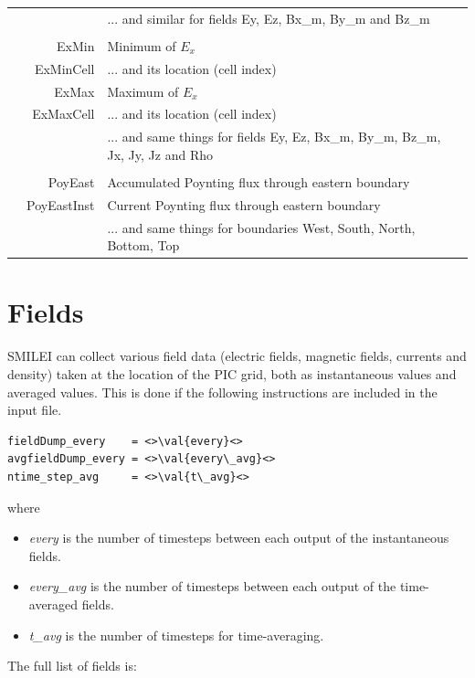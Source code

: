 \documentclass[11pt]{article}
\newcommand{\val}[1]{{\ttfamily \textit{#1}}}
\begin{document}
\begin{tabularx}{\textwidth}{X r | l X}
& & ... and similar for fields Ey, Ez, Bx\_m, By\_m and Bz\_m & \\
& & & \\
& ExMin & Minimum of $E_x$ & \\
& ExMinCell &  ... and its location (cell index) & \\
& ExMax & Maximum of $E_x$ & \\
& ExMaxCell &  ... and its location (cell index) & \\
& & ... and same things for fields Ey, Ez, Bx\_m, By\_m, Bz\_m, Jx, Jy, Jz and Rho & \\
& & & \\
& PoyEast & Accumulated Poynting flux through eastern boundary & \\
& PoyEastInst & Current Poynting flux through eastern boundary & \\
& & ... and same things for boundaries West, South, North, Bottom, Top &\\
\end{tabularx}
\vfill

\clearpage


\section{Fields\label{sec:fields}}

SMILEI can collect various field data (electric fields, magnetic fields, currents and density)
taken at the location of the PIC grid, both as instantaneous values and averaged values.
This is done if the following instructions are included in the input file.
\begin{lstlisting}
fieldDump_every    = <>\val{every}<>
avgfieldDump_every = <>\val{every\_avg}<>
ntime_step_avg     = <>\val{t\_avg}<>
\end{lstlisting}
where
\begin{itemize}
\item \val{every} is the number of timesteps between each output of the instantaneous fields.
\item \val{every\_avg} is the number of timesteps between each output of the time-averaged fields.
\item \val{t\_avg} is the number of timesteps for time-averaging.
\end{itemize}
\vspace{1cm}
The full list of fields is:\\
\end{document}

